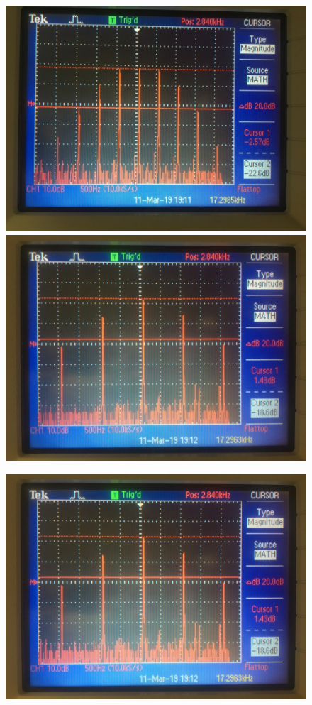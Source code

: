 \begin{figure}[H]
\begin{minipage}{0.4\linewidth}
		\includegraphics[width=\linewidth]{photo/task33(3).jpg}
	\end{minipage}
	\begin{minipage}{0.4\linewidth}
		\centering
		\includegraphics[width=\linewidth]{photo/task33(4).jpg}
	\end{minipage}
\end{figure}
\begin{figure}[H]
	\centering
	\includegraphics[width=0.45\linewidth]{photo/task33(5).jpg}
\end{figure}
